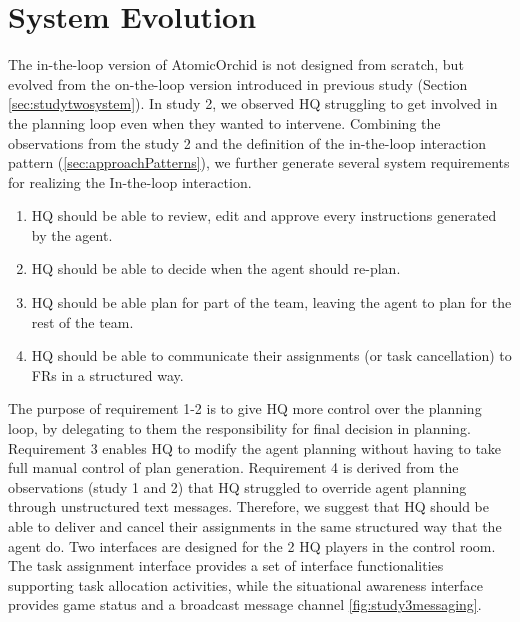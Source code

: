\section{System Evolution}\label{sec:study3system}
The in-the-loop version of AtomicOrchid is not designed from scratch, but evolved from the on-the-loop version introduced in previous study (Section \ref{sec:studytwosystem}). In study 2, we observed HQ struggling to get involved in the planning loop even when they wanted to intervene. Combining the observations from the study 2 and the definition of the in-the-loop interaction pattern (\ref{sec:approachPatterns}), we further generate several system requirements for realizing the In-the-loop interaction. \\
\begin{enumerate}
\item HQ should be able to review, edit and approve every instructions generated by the agent.
\item HQ should be able to decide when the agent should re-plan. 
\item HQ should be able plan for part of the team, leaving the agent to plan for the rest of the team. 
\item HQ should be able to communicate their assignments (or task cancellation) to FRs in a structured way. 
\end{enumerate}

The purpose of requirement 1-2 is to give HQ more control over the planning loop, by delegating to them the responsibility for final decision in planning. Requirement 3 enables HQ to modify the agent planning without having to take full manual control of plan generation. Requirement 4 is derived from the observations (study 1 and 2) that HQ struggled to override agent planning through unstructured text messages. Therefore, we suggest that HQ should be able to deliver and cancel their assignments in the same structured way that the agent do. Two interfaces are designed for the 2 HQ players in the control room. The task assignment interface provides a set of interface functionalities supporting task allocation activities, while the situational awareness interface provides game status and a broadcast message channel \ref{fig:study3messaging}.  \\


